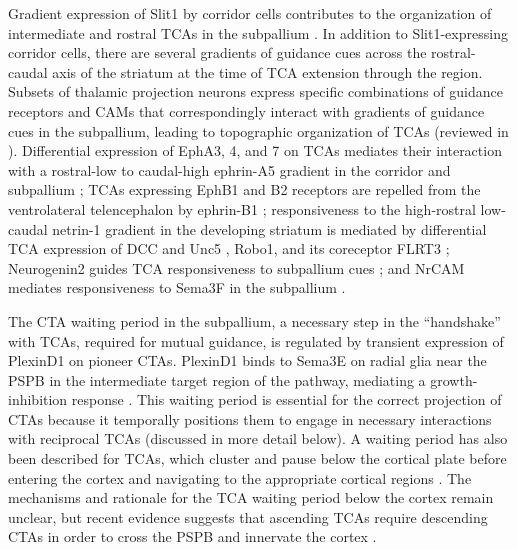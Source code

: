 Gradient expression of Slit1 by corridor cells contributes to the organization of intermediate and rostral TCAs in the subpallium \cite{bielle2011emergent}. 
In addition to Slit1-expressing corridor cells, there are several gradients of guidance cues across the rostral-caudal axis of the striatum at the time of TCA extension through the region. 
Subsets of thalamic projection neurons express specific combinations of guidance receptors and CAMs that correspondingly interact with gradients of guidance cues in the subpallium, leading to topographic organization of TCAs (reviewed in \cite{garel2014inputs,molnar2012mechanisms}). 
Differential expression of EphA3, 4, and 7 on TCAs mediates their interaction with a rostral-low to caudal-high ephrin-A5 gradient in the corridor and subpallium \cite{dufour2003area}; TCAs expressing EphB1 and B2 receptors are repelled from the ventrolateral telencephalon by ephrin-B1 \cite{robichaux2014ephb}; responsiveness to the high-rostral low-caudal netrin-1 gradient in the developing striatum is mediated by differential TCA expression of DCC and Unc5 \cite{powell2008topography}, Robo1, and its coreceptor FLRT3 \cite{leyva2014flrt3}; Neurogenin2 guides TCA responsiveness to subpallium cues \cite{seibt2003neurogenin2}; and NrCAM mediates responsiveness to Sema3F in the subpallium \cite{demyanenko2011nrcam}. 

The CTA waiting period in the subpallium, a necessary step in the “handshake” with TCAs, required for mutual guidance, is regulated by transient expression of PlexinD1 on pioneer CTAs. 
PlexinD1 binds to Sema3E on radial glia near the PSPB in the intermediate target region of the pathway, mediating a growth-inhibition response \cite{deck2013pathfinding}. 
This waiting period is essential for the correct projection of CTAs because it temporally positions them to engage in necessary interactions with reciprocal TCAs (discussed in more detail below). 
A waiting period has also been described for TCAs, which cluster and pause below the cortical plate before entering the cortex and navigating to the appropriate cortical regions \cite{ghosh1992pathfinding,leyva2013and,lund1977development}. 
The mechanisms and rationale for the TCA waiting period below the cortex remain unclear, but recent evidence suggests that ascending TCAs require descending CTAs in order to cross the PSPB and innervate the cortex \cite{chen2012evidence}.
